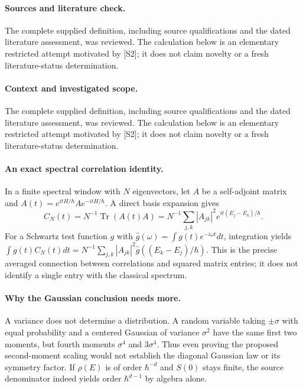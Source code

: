 \documentclass[11pt]{article}
\begin{document}
\paragraph{Sources and literature check.}
The complete supplied definition, including source qualifications and the dated literature assessment, was reviewed. The calculation below is an elementary restricted attempt motivated by [S2]; it does not claim novelty or a fresh literature-status determination.

\paragraph{Context and investigated scope.} The complete supplied definition, including source qualifications and the dated literature assessment, was reviewed. The calculation below is an elementary restricted attempt motivated by [S2]; it does not claim novelty or a fresh literature-status determination.

\paragraph{An exact spectral correlation identity.} In a finite spectral window with $N$ eigenvectors, let $A$ be a self-adjoint matrix and $A(t)=e^{itH/\hbar}Ae^{-itH/\hbar}$. A direct basis expansion gives
\[
 C_N(t)=N^{-1}\operatorname{Tr}(A(t)A)
 =N^{-1}\sum_{j,k}|A_{jk}|^2e^{it(E_j-E_k)/\hbar}.
\]
For a Schwartz test function $g$ with $\widehat g(\omega)=\int g(t)e^{-i\omega t}dt$, integration yields $\int g(t)C_N(t)dt=N^{-1}\sum_{j,k}|A_{jk}|^2\widehat g((E_k-E_j)/\hbar)$. This is the precise averaged connection between correlations and squared matrix entries; it does not identify a single entry with the classical spectrum.

\paragraph{Why the Gaussian conclusion needs more.} A variance does not determine a distribution. A random variable taking $\pm\sigma$ with equal probability and a centered Gaussian of variance $\sigma^2$ have the same first two moments, but fourth moments $\sigma^4$ and $3\sigma^4$. Thus even proving the proposed second-moment scaling would not establish the diagonal Gaussian law or its symmetry factor. If $\rho(E)$ is of order $\hbar^{-d}$ and $S(0)$ stays finite, the source denominator indeed yields order $\hbar^{d-1}$ by algebra alone.
\end{document}
